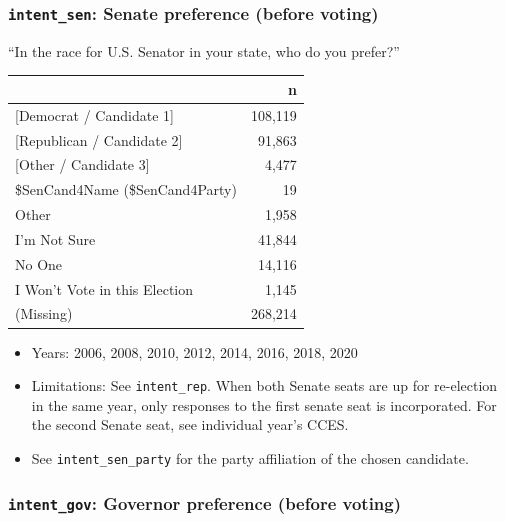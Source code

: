 \documentclass[10pt,article,oneside]{memoir}
\theoremstyle{definition}
\begin{document}
\hypertarget{intent_sen-senate-preference-before-voting}{%
\subsubsection{\texorpdfstring{\texttt{intent\_sen}: Senate preference
(before
voting)}{intent\_sen: Senate preference (before voting)}}\label{intent_sen-senate-preference-before-voting}}

``In the race for U.S. Senator in your state, who do you prefer?''

\begin{table}[H]
\centering
\begin{tabular}{lr}
\toprule
 & n\\
\midrule
{[Democrat / Candidate 1]} & 108,119\\
{[Republican / Candidate 2]} & 91,863\\
{[Other / Candidate 3]} & 4,477\\
\$SenCand4Name (\$SenCand4Party) & 19\\
Other & 1,958\\
I'm Not Sure & 41,844\\
No One & 14,116\\
I Won't Vote in this Election & 1,145\\
(Missing) & 268,214\\
\bottomrule
\end{tabular}
\end{table}

\begin{itemize}
\tightlist
\item
  Years: 2006, 2008, 2010, 2012, 2014, 2016, 2018, 2020
\item
  Limitations: See \texttt{intent\_rep}. When both Senate seats are up
  for re-election in the same year, only responses to the first senate
  seat is incorporated. For the second Senate seat, see individual
  year's CCES.
\item
  See \texttt{intent\_sen\_party} for the party affiliation of the
  chosen candidate.
\end{itemize}

\hypertarget{intent_gov-governor-preference-before-voting}{%
\subsubsection{\texorpdfstring{\texttt{intent\_gov}: Governor preference
(before
voting)}{intent\_gov: Governor preference (before voting)}}\label{intent_gov-governor-preference-before-voting}}
\end{document}
